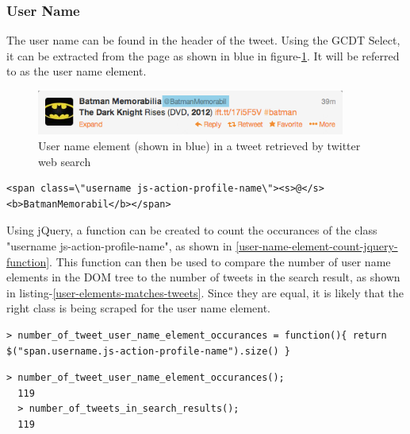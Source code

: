 \subsubsection{User Name}
The user name can be found in the header of the tweet. Using the GCDT Select, it can be extracted from the page as shown in blue in figure-\ref{figure:tweet-user-field}. It will be referred to as the user name element.

\begin{figure}[H]
\includegraphics[width=4in]{image/tweet-user-field.png}
\centering
\caption{User name element (shown in blue) in a tweet retrieved by twitter web search}
\label{figure:tweet-user-field}
\end{figure}

\begin{lstlisting}[caption={HTML of the user name element in a tweet},label={user-name-element-html},captionpos=b]
  <span class=\"username js-action-profile-name\"><s>@</s><b>BatmanMemorabil</b></span>
\end{lstlisting}

\noindent
Using jQuery, a function can be created to count the occurances of the class "username js-action-profile-name", as shown in \ref{user-name-element-count-jquery-function}. This function can then be used to compare the number of user name elements in the DOM tree to the number of tweets in the search result, as shown in listing-\ref{user-elements-matches-tweets}. Since they are equal, it is likely that the right class is being scraped for the user name element.

\begin{lstlisting}[caption={Creating a function in GCDT Javascript Console for counting the occurance of user name elements on the twitter search result page},label={user-name-element-count-jquery-function},captionpos=b]
  > number_of_tweet_user_name_element_occurances = function(){ return $("span.username.js-action-profile-name").size() }
\end{lstlisting}


\begin{lstlisting}[caption={Running functions in GCDT Javascript Console to show that the number of user name elements matches the number of tweets},label={user-elements-matches-tweets},captionpos=b]
  > number_of_tweet_user_name_element_occurances();
  119
  > number_of_tweets_in_search_results();
  119
\end{lstlisting}

